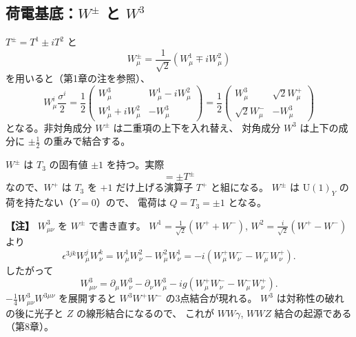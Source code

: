 \documentclass[uplatex,dvipdfmx,a4paper,11pt,openany]{jsbook}
\newenvironment{note}{\vspace{1ex}\par\footnotesize\noindent\textbf{【注】}}{\par\vspace{1ex}}
\numberwithin{equation}{chapter}
\theoremstyle{definition}
\theoremstyle{plain}
\theoremstyle{remark}
\newcommand{\U}{\mathrm{U}}
\begin{document}
\subsection{荷電基底：$W^\pm$ と $W^3$}
$T^\pm=T^1\pm iT^2$ と
\begin{equation}
W_\mu^\pm=\frac{1}{\sqrt2}\left(W_\mu^1\mp iW_\mu^2\right)
\end{equation}
を用いると（第1章の注を参照）、
\begin{equation}
W_\mu^i\frac{\sigma^i}{2}
=\frac12\begin{pmatrix}
W_\mu^3 & W_\mu^1-iW_\mu^2\\
W_\mu^1+iW_\mu^2 & -W_\mu^3
\end{pmatrix}
=\frac12\begin{pmatrix}
W_\mu^3 & \sqrt2W_\mu^+\\
\sqrt2W_\mu^- & -W_\mu^3
\end{pmatrix}
\label{eq:Wmatrix}
\end{equation}
となる。非対角成分 $W^\pm$ は二重項の上下を入れ替え、
対角成分 $W^3$ は上下の成分に $\pm\frac12$ の重みで結合する。

$W^\pm$ は $T_3$ の固有値 $\pm1$ を持つ。実際
\begin{equation}
[T^3,T^\pm]=\pm T^\pm
\end{equation}
なので、$W^+$ は $T_3$ を $+1$ だけ上げる演算子 $T^+$ と組になる。
$W^\pm$ は $\U(1)_Y$ の荷を持たない（$Y=0$）ので、
電荷は $Q=T_3=\pm1$ となる。
\begin{note}
$W^3_{\mu\nu}$ を $W^\pm$ で書き直す。
$W^1=\frac{1}{\sqrt2}(W^++W^-)$, $W^2=\frac{i}{\sqrt2}(W^+-W^-)$ より
\[
\epsilon^{3jk}W^j_\mu W^k_\nu
=W^1_\mu W^2_\nu-W^2_\mu W^1_\nu
=-i\left(W^+_\mu W^-_\nu-W^-_\mu W^+_\nu\right).
\]
したがって
\[
W^3_{\mu\nu}=\partial_\mu W^3_\nu-\partial_\nu W^3_\mu-ig\left(W^+_\mu W^-_\nu-W^-_\mu W^+_\nu\right).
\]
$-\frac14W^3_{\mu\nu}W^{3\mu\nu}$ を展開すると $W^3W^+W^-$ の3点結合が現れる。
$W^3$ は対称性の破れの後に光子と $Z$ の線形結合になるので、
これが $WW\gamma$, $WWZ$ 結合の起源である（第8章）。
\end{note}
\end{document}
